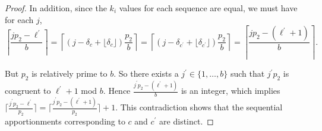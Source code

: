 \documentclass[pdflatex,sn-mathphys-num]{sn-jnl}
\theoremstyle{thmstyleone}%
\theoremstyle{thmstyletwo}%
\theoremstyle{thmstylethree}%
\begin{document}
\begin{proof}
In addition, since the $k_i$ values for each sequence are equal, we must have for each $j$,
$$ \left\lceil  \frac{jp_2-\ell^\prime}{b} \right\rceil= \left\lceil (j-\delta_c+\lfloor \delta_c \rfloor )\frac{p_2}{b} \right\rceil  = \left\lceil (j-\delta_{c^\prime} +\lfloor \delta_{c^\prime} \rfloor)\frac{p_2}{b} \right\rceil =  \left\lceil  \frac{j p_2-(\ell^\prime+1)}{b} \right\rceil.$$

But $p_2$ is relatively prime to $b$. So there exists a $j^\prime\in \{1, \ldots, b\}$ such that $j^\prime p_2$ is congruent to $\ell^\prime + 1$ mod $b$. Hence  $\frac{j^\prime p_2-(\ell^\prime+1)}{b}$ is an integer, which implies $\lceil \frac{j^\prime p_2-\ell^\prime}{p_2} \rceil =  \lceil  \frac{j^\prime p_2-(\ell^\prime+1)}{p_2} \rceil+1.$ This contradiction shows that 
 the sequential apportionments corresponding to $c$ and $c^\prime$ are distinct.   \end{proof} 
\end{document}
